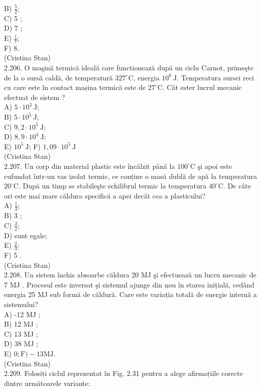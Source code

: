 \documentclass[10pt]{article}
\begin{document}
B) $\frac{5}{2}$;\\
C) 5 ;\\
D) 7 ;\\
E) $\frac{1}{7}$;\\
F) 8.\\
(Cristina Stan)\\
2.206. O maşină termică ideală care functionează după un ciclu Carnot, primeşte de la o sursă caldă, de temperatură $327^{\circ} \mathrm{C}$, energia $10^{6} \mathrm{~J}$. Temperatura sursei reci cu care este în contact mașina termică este de $27^{\circ} \mathrm{C}$. Cât ester lucrul mecanic efectuat de sistem ?\\
A) $5 \cdot 10^{3} \mathrm{~J}$;\\
B) $5 \cdot 10^{5} \mathrm{~J}$;\\
C) $9,2 \cdot 10^{5} \mathrm{~J}$;\\
D) $8,9 \cdot 10^{3} \mathrm{~J}$;\\
E) $10^{5} \mathrm{~J}$; F) $1,09 \cdot 10^{5} \mathrm{~J}$\\
(Cristina Stan)\\
2.207. Un corp din material plastic este încălzit până la $100^{\circ} \mathrm{C}$ şi apoi este cufundat într-un vas izolat termic, ce conține o masă dublă de apă la temperatura $20^{\circ} \mathrm{C}$. După un timp se stabileşte echilibrul termic la temperatura $40^{\circ} \mathrm{C}$. De câte ori este mai mare căldura specifică a apei decât cea a plasticului?\\
A) $\frac{1}{3}$;\\
B) 3 ;\\
C) $\frac{3}{2}$;\\
D) sunt egale;\\
E) $\frac{2}{3}$;\\
F) 5 .\\
(Cristina Stan)\\
2.208. Un sistem închis absoarbe căldura 20 MJ şi efectuează un lucru mecanic de 7 MJ . Procesul este inversat şi sistemul ajunge din nou în starea inițială, cedând energia 25 MJ sub formă de căldură. Care este variația totală de energie internă a sistemului?\\
A) -12 MJ ;\\
B) 12 MJ ;\\
C) 13 MJ ;\\
D) 38 MJ ;\\
E) $0 ; \mathrm{F})-13 \mathrm{MJ}$.\\
(Cristina Stan)\\
2.209. Folosiți ciclul reprezentat în Fig. 2.31 pentru a alege afirmațiile corecte dintre următoarele variante:
\end{document}
